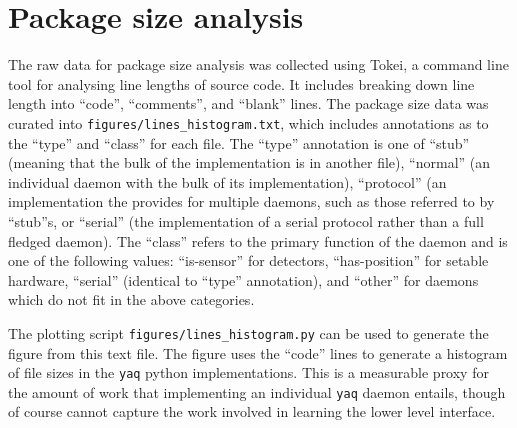 \documentclass[11pt, full]{article}
\newcommand\yaq{\texttt{yaq}}
\let\stdsection\section
\renewcommand\section{\clearpage\stdsection}
\begin{document}


\clearpage

\section{Package size analysis}

The raw data for package size analysis was collected using Tokei\cite{tokei}, a command line tool for analysing line lengths of source code.
It includes breaking down line length into ``code'', ``comments'', and ``blank'' lines.
The package size data was curated into \texttt{figures/lines\_histogram.txt}, which includes annotations as to the ``type'' and ``class'' for each file.
The ``type'' annotation is one of ``stub'' (meaning that the bulk of the implementation is in another file), ``normal'' (an individual daemon with the bulk of its implementation), ``protocol'' (an implementation the provides for multiple daemons, such as those referred to by ``stub''s, or ``serial'' (the implementation of a serial protocol rather than a full fledged daemon).
The ``class'' refers to the primary function of the daemon and is one of the following values: ``is-sensor'' for detectors, ``has-position'' for setable hardware, ``serial'' (identical to ``type'' annotation), and ``other'' for daemons which do not fit in the above categories.

The plotting script \texttt{figures/lines\_histogram.py} can be used to generate the figure from this text file.
The figure uses the ``code'' lines to generate a histogram of file sizes in the \yaq{} python implementations.
This is a measurable proxy for the amount of work that implementing an individual \yaq{} daemon entails, though of course cannot capture the work involved in learning the lower level interface.

\clearpage

\printbibliography
\end{document}
